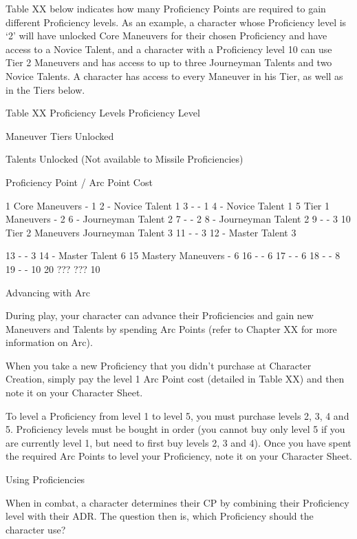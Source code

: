 \documentclass[oneside,11pt,english]{book}
\begin{document}
 

Table XX below indicates how many Proficiency Points are required to gain different Proficiency levels. 
As an example, a character whose Proficiency level is ‘2’ will have unlocked Core Maneuvers for their 
chosen Proficiency and have access to a Novice Talent, and a character with a Proficiency level 10 can 
use Tier 2 Maneuvers and has access to up to three Journeyman Talents and two Novice Talents. A 
character has access to every Maneuver in his Tier, as well as in the Tiers below. 

 
Table XX Proficiency Levels 
Proficiency 
Level 

Maneuver Tiers 
Unlocked 

Talents Unlocked 
(Not available to Missile 
Proficiencies) 

Proficiency Point / Arc Point 
Cost 

1 Core Maneuvers - 1 
2 - Novice Talent 1 
3 - - 1 
4 - Novice Talent 1 
5 Tier 1 Maneuvers - 2 
6 - Journeyman Talent 2 
7 - - 2 
8 - Journeyman Talent 2 
9 - - 3 
10 Tier 2 Maneuvers Journeyman Talent 3 
11 - - 3 
12 - Master Talent 3 


13 - - 3 
14 - Master Talent 6 
15 Mastery Maneuvers - 6 
16 - - 6 
17 - - 6 
18 - - 8 
19 - - 10 
20 ??? ??? 10 

 

Advancing with Arc 

 

During play, your character can advance their Proficiencies and gain new Maneuvers and Talents by 
spending Arc Points (refer to Chapter XX for more information on Arc). 

 

When you take a new Proficiency that you didn’t purchase at Character Creation, simply pay the level 1 
Arc Point cost (detailed in Table XX) and then note it on your Character Sheet. 

 

To level a Proficiency from level 1 to level 5, you must purchase levels 2, 3, 4 and 5. Proficiency levels 
must be bought in order (you cannot buy only level 5 if you are currently level 1, but need to first buy 
levels 2, 3 and 4). Once you have spent the required Arc Points to level your Proficiency, note it on your 
Character Sheet. 

 

Using Proficiencies 

 

When in combat, a character determines their CP by combining their Proficiency level with their ADR. 
The question then is, which Proficiency should the character use? 
\end{document}
